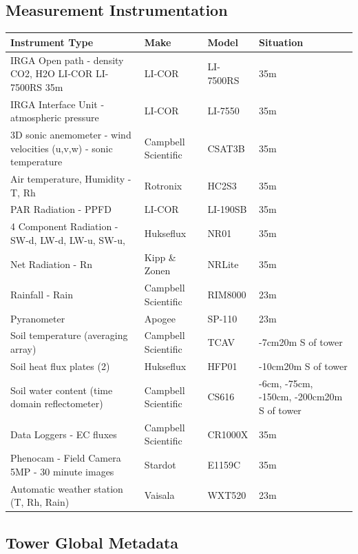 \documentclass[11pt,a4paper]{article}
\begin{document}
\subsection*{Measurement Instrumentation}

\begin{longtable}{p{4.5cm}p{3.5cm}p{3.5cm}p{3.5cm}}
\toprule
\textbf{Instrument Type} & \textbf{Make} & \textbf{Model} & \textbf{Situation} \\
\midrule
\endhead
\bottomrule
\endfoot
IRGA Open path                  - density CO2, H2O  LI-COR LI-7500RS 35m & LI-COR & LI-7500RS & 35m \\
IRGA Interface Unit                 - atmospheric pressure & LI-COR & LI-7550 & 35m \\
3D sonic anemometer                 - wind velocities (u,v,w)                  - sonic temperature & Campbell Scientific & CSAT3B & 35m \\
Air temperature, Humidity                  - T, Rh & Rotronix & HC2S3 & 35m \\
PAR Radiation                  - PPFD & LI-COR & LI-190SB & 35m \\
4 Component Radiation                  - SW-d, LW-d, LW-u, SW-u, & Hukseflux & NR01 & 35m \\
Net Radiation                  - Rn & Kipp \& Zonen & NRLite & 35m \\
Rainfall                 - Rain & Campbell Scientific & RIM8000 & 23m \\
Pyranometer & Apogee & SP-110 & 23m \\
Soil temperature                  (averaging array) & Campbell Scientific & TCAV & -7cm20m S of tower \\
Soil heat flux plates (2) & Hukseflux & HFP01 & -10cm20m S of tower \\
Soil water content                  (time domain reflectometer) & Campbell Scientific & CS616 & -6cm, -75cm, -150cm, -200cm20m S of tower \\
Data Loggers                 - EC fluxes & Campbell Scientific & CR1000X & 35m \\
Phenocam - Field Camera 5MP                 - 30 minute images & Stardot & E1159C & 35m \\
Automatic weather station                  (T, Rh, Rain) & Vaisala & WXT520 & 23m \\
\end{longtable}


\subsection*{Tower Global Metadata}
\end{document}

